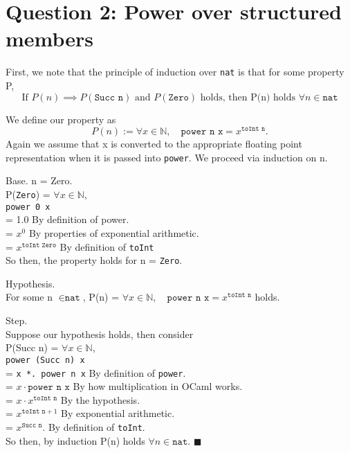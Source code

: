 \documentclass{article}
\begin{document}
\newpage




\section{Question 2: Power over structured members}
\noindent
First, we note that the principle of induction over \texttt{nat} is that for some property P,
\[ \text{If } P(n) \implies P(\texttt{Succ n}) \text{ and } P(\texttt{Zero}) \text{ holds, then P(n) holds } \forall n \in \texttt{nat} \]

\noindent
We define our property as
\[ P(n) := \forall x \in \mathbb{N}, \quad \texttt{power n x} = x^\texttt{toInt n}. \]
Again we assume that x is converted to the appropriate floating point representation
when it is passed into \texttt{power}. We proceed via induction on n.

\bigskip

\noindent
Base. n = Zero. \\
\indent P(\texttt{Zero}) = $\forall x \in \mathbb{N}$, \\
\indent \texttt{power 0 x} \\
\indent = 1.0 \qquad By definition of power. \\
\indent = $x^0$ \qquad By properties of exponential arithmetic. \\
\indent = $x^\texttt{toInt Zero}$ \qquad By definition of \texttt{toInt} \\
\noindent So then, the property holds for n = \texttt{Zero}.

\bigskip

\noindent
Hypothesis. \\
\indent For some n $\in \texttt{nat}$, P(n) = $\forall x \in \mathbb{N}, \quad \texttt{power n x} = x^\texttt{toInt n}$ holds.

\bigskip

\noindent
Step. \\
Suppose our hypothesis holds, then consider \\
\indent P(Succ n) = $\forall x \in \mathbb{N}$, \\
\indent \texttt{power (Succ n) x} \\
\indent = \texttt{x *. power n x} \qquad By definition of \texttt{power}. \\
\indent = $x \cdot \texttt{power n x}$ \qquad By how multiplication in OCaml works. \\
\indent = $x \cdot x^\texttt{toInt n}$ \qquad By the hypothesis. \\
\indent = $x^{\texttt{toInt n} + 1}$ \qquad By exponential arithmetic. \\
\indent = $x^\texttt{Succ n}$. \qquad By definition of \texttt{toInt}. \\
\noindent So then, by induction P(n) holds $\forall n \in \texttt{nat}$. $\blacksquare$
\end{document}
